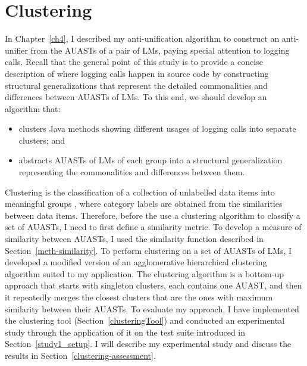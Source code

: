 \chapter{Clustering}  \label{clustering}
In Chapter~\ref{ch4}, I described my anti-unification algorithm to construct an anti-unifier from the AUASTs of a pair of LMs, paying special attention to logging calls. Recall that the general point of this study is to provide a concise description of where logging calls happen in source code by constructing structural generalizations that represent the detailed commonalities and differences between AUASTs of LMs. To this end, we should develop an algorithm that:
\begin{itemize} [leftmargin=.5in]
\item clusters Java methods showing different usages of logging calls into separate clusters; and

\item abstracts AUASTs of LMs of each group into a structural generalization representing the commonalities and differences between them.
\end{itemize}

Clustering is the classification of a collection of unlabelled data items into meaningful groups \cite{jain1999data}, where category labels are obtained from the similarities between data items. Therefore, before the use a clustering algorithm to classify a set of AUASTs, I need to first define a similarity metric. To develop a measure of similarity between AUASTs, I used the similarity function described in Section~\ref{meth-similarity}. To perform clustering on a set of AUASTs of LMs, I developed a modified version of an agglomerative hierarchical clustering algorithm suited to my application. The clustering algorithm is a bottom-up approach that starts with singleton clusters, each contains one AUAST, and then it repeatedly merges the closest clusters that are the ones with maximum similarity between their AUASTs. To evaluate my approach, I have implemented the clustering tool (Section~\ref{clusteringTool}) and conducted an experimental study through the application of it on the test suite introduced in Section~\ref{study1_setup}. I will describe my experimental study and discuss the results in Section~\ref{clustering-assessment}.



